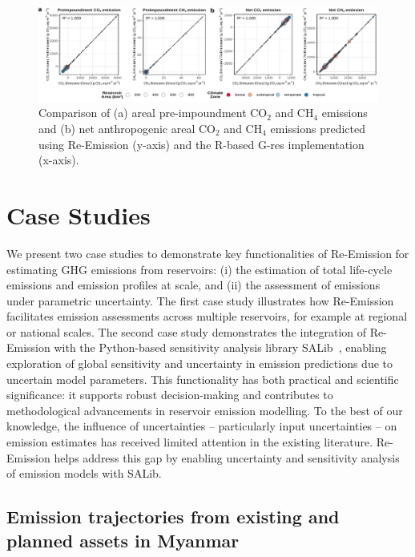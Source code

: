 \documentclass[final,1p,times]{elsarticle}
\begin{document}
\begin{figure}[ht]
    \centering
    \includegraphics[width=1.0\textwidth]{figures/comparison_plot_net_emissions.pdf}
    \caption{{Comparison of (a) areal pre-impoundment CO$_2$ and CH$_4$ emissions and (b) net anthropogenic areal CO$_2$ and CH$_4$ emissions predicted using Re-Emission (y-axis) and the R-based G-res implementation (x-axis).}}
    
    \label{fig:validation_plot_net_emissions}
\end{figure}

\section{Case Studies}
\label{sec:case_studies}

We present two case studies to demonstrate key functionalities of Re-Emission for estimating \ac{GHG} emissions from reservoirs: (i) the estimation of total life-cycle emissions and emission profiles at scale, and (ii) the assessment of emissions under parametric uncertainty.
The first case study illustrates how Re-Emission facilitates emission assessments across multiple reservoirs, for example at regional or national scales. The second case study demonstrates the integration of Re-Emission with the Python-based sensitivity analysis library SALib~\cite{Iwanaga_Toward_SALib_2_0_2022}, enabling exploration of global sensitivity and uncertainty in emission predictions due to uncertain model parameters.
This functionality has both practical and scientific significance: it supports robust decision-making and contributes to methodological advancements in reservoir emission modelling.
To the best of our knowledge, the influence of uncertainties -- particularly input uncertainties -- on emission estimates has received limited attention in the existing literature.
Re-Emission helps address this gap by enabling uncertainty and sensitivity analysis of emission models with SALib.

\subsection{Emission trajectories from existing and planned assets in Myanmar}
\label{subsec:myanmar}
\end{document}
